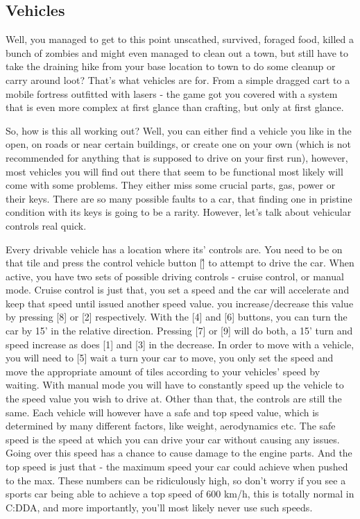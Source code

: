 \documentclass[11pt]{report}
\begin{document}
\subsection{Vehicles}

Well, you managed to get to this point unscathed, survived, foraged food, killed a bunch of zombies and might even managed to clean out a town, but still have to take the draining hike from your base location to town to do some cleanup or carry around loot? That's what vehicles are for. From a simple dragged cart to a mobile fortress outfitted with lasers - the game got you covered with a system that is even more complex at first glance than crafting, but only at first glance.

So, how is this all working out? Well, you can either find a vehicle you like in the open, on roads or near certain buildings, or create one on your own (which is not recommended for anything that is supposed to drive on your first run), however, most vehicles you will find out there that seem to be functional most likely will come with some problems. They either miss some crucial parts, gas, power or their keys. There are so many possible faults to a car, that finding one in pristine condition with its keys is going to be a rarity. However, let's talk about vehicular controls real quick.

Every drivable vehicle has a location where its' controls are. You need to be on that tile and press the control vehicle button [\^] to attempt to drive the car. When active, you have two sets of possible driving controls - cruise control, or manual mode. Cruise control is just that, you set a speed and the car will accelerate and keep that speed until issued another speed value. you increase/decrease this value by pressing [8] or [2] respectively. With the [4] and [6] buttons, you can turn the car by 15' in the relative direction. Pressing [7] or [9] will do both, a 15' turn and speed increase as does [1] and [3] in the decrease. In order to move with a vehicle, you will need to [5] wait a turn your car to move, you only set the speed and move the appropriate amount of tiles according to your vehicles' speed by waiting. With manual mode you will have to constantly speed up the vehicle to the speed value you wish to drive at. Other than that, the controls are still the same.
Each vehicle will however have a safe and top speed value, which is determined by many different factors, like weight, aerodynamics etc. The safe speed is the speed at which you can drive your car without causing any issues. Going over this speed has a chance to cause damage to the engine parts. And the top speed is just that - the maximum speed your car could achieve when pushed to the max. These numbers can be ridiculously high, so don't worry if you see a sports car being able to achieve a top speed of 600 km/h, this is totally normal in C:DDA, and more importantly, you'll most likely never use such speeds.
\end{document}
